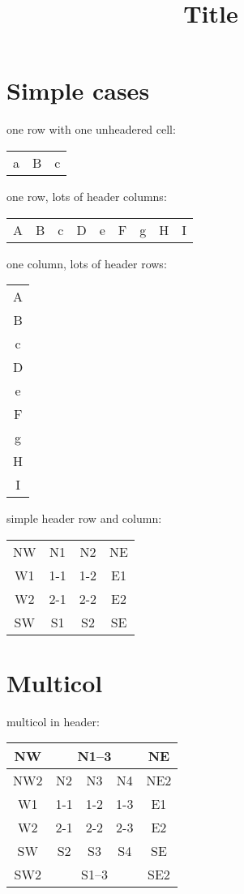 \documentclass{article}
\title{Title}
\begin{document}
\section{Simple cases}
one row with one unheadered cell:\\
\begin{tabular}{ccc}
a&B&c
\end{tabular}

one row, lots of header columns:\\
\begin{tabular}{ccccccccc}
A&B&c&D&e&F&g&H&I
\end{tabular}

one column, lots of header rows:\\
\begin{tabular}{c}
A\\B\\c\\D\\e\\F\\g\\H\\I
\end{tabular}

simple header row and column:\\
\begin{tabular}{cccc}
NW&N1&N2&NE\\
W1 & 1-1& 1-2&E1 \\
W2 & 2-1 & 2-2 &E2\\
SW&S1&S2&SE
\end{tabular}

\section{Multicol}
multicol in header:\\
\begin{tabular}{|c|c|c|c|c|}\hline
NW&\multicolumn{3}{|c|}{N1--3}&NE \\\hline
NW2& N2 & N3 & N4 & NE2\\\hline
W1 & 1-1 & 1-2 & 1-3 & E1 \\\hline
W2 & 2-1 & 2-2 & 2-3 & E2 \\\hline
SW& S2 & S3 & S4 &SE\\\hline
SW2&\multicolumn{3}{|c|}{S1--3}&SE2\\\hline
\end{tabular}
\end{document}
